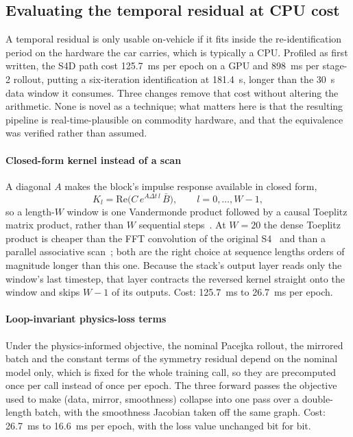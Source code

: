 \subsection{Evaluating the temporal residual at CPU cost}
\label{sup:s4cost}
A temporal residual is only usable on-vehicle if it fits inside the
re-identification period on the hardware the car carries, which is typically a
CPU. Profiled as first written, the S4D path cost \SI{125.7}{\milli\second} per
epoch on a GPU and \SI{898}{\milli\second} per stage-2 rollout, putting a
six-iteration identification at \SI{181.4}{\second}, longer than the
\SI{30}{\second} data window it consumes. Three changes remove that cost
without altering the arithmetic. None is novel as a technique; what matters
here is that the resulting pipeline is real-time-plausible on commodity
hardware, and that the equivalence was verified rather than assumed.

\paragraph{Closed-form kernel instead of a scan}
A diagonal $A$ makes the block's impulse response available in closed form,
\begin{equation}
K_{l}=\mathrm{Re}\big(C\,e^{A\Delta t\,l}\,\bar B\big),\qquad l=0,\dots,W-1,
\label{eq:s4kernel}
\end{equation}
so a length-$W$ window is one Vandermonde product followed by a causal Toeplitz
matrix product, rather than $W$ sequential steps~\cite{gu2022s4d}. At $W=20$
the dense Toeplitz product is cheaper than the FFT convolution of the original
S4~\cite{gu2022s4} and than a parallel associative scan~\cite{smith2023s5};
both are the right choice at sequence lengths orders of magnitude longer than
this one. Because the stack's output layer reads only the window's last
timestep, that layer contracts the reversed kernel straight onto the window and
skips $W-1$ of its outputs. Cost: \SI{125.7}{\milli\second} to
\SI{26.7}{\milli\second} per epoch.

\paragraph{Loop-invariant physics-loss terms}
Under the physics-informed objective, the nominal Pacejka rollout, the mirrored
batch and the constant terms of the symmetry residual depend on the nominal
model only, which is fixed for the whole training call, so they are precomputed
once per call instead of once per epoch. The three forward passes the objective
used to make (data, mirror, smoothness) collapse into one pass over a
double-length batch, with the smoothness Jacobian taken off the same graph.
Cost: \SI{26.7}{\milli\second} to \SI{16.6}{\milli\second} per epoch, with the
loss value unchanged bit for bit.

